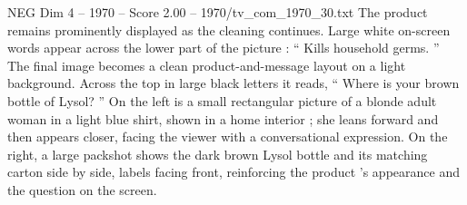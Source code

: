\begin{textsample}{NEG Dim 4 – 1970 – Score 2.00 – 1970/tv\_com\_1970\_30.txt}
The product remains prominently displayed as the cleaning continues.
Large white on-screen words appear across the lower part of the picture : “ Kills household germs. ” The final image becomes a clean product-and-message layout on a light background.
Across the top in large black letters it reads, “ Where is your brown bottle of Lysol? ” On the left is a small rectangular picture of a blonde adult woman in a light blue shirt, shown in a home interior ; she leans forward and then appears closer, facing the viewer with a conversational expression.
On the right, a large packshot shows the dark brown Lysol bottle and its matching carton side by side, labels facing front, reinforcing the product ’s appearance and the question on the screen.

\end{textsample}
